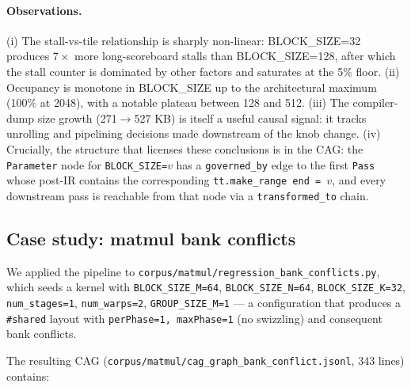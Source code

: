 \documentclass[10pt]{article}
\begin{document}
\paragraph{Observations.} (i) The stall-vs-tile relationship is sharply non-linear: BLOCK\_SIZE=32 produces $7\times$ more long-scoreboard stalls than BLOCK\_SIZE=128, after which the stall counter is dominated by other factors and saturates at the 5\% floor. (ii) Occupancy is monotone in BLOCK\_SIZE up to the architectural maximum (100\% at 2048), with a notable plateau between 128 and 512. (iii) The compiler-dump size growth (271$\to$527 KB) is itself a useful causal signal: it tracks unrolling and pipelining decisions made downstream of the knob change. (iv) Crucially, the structure that licenses these conclusions is in the CAG: the \texttt{Parameter} node for \texttt{BLOCK\_SIZE=$v$} has a \texttt{governed\_by} edge to the first \texttt{Pass} whose post-IR contains the corresponding \texttt{tt.make\_range end = $v$}, and every downstream pass is reachable from that node via a \texttt{transformed\_to} chain.

\subsection{Case study: matmul bank conflicts}\label{sec:matmul}

We applied the pipeline to \texttt{corpus/matmul/regression\_bank\_conflicts.py}, which seeds a kernel with \texttt{BLOCK\_SIZE\_M=64}, \texttt{BLOCK\_SIZE\_N=64}, \texttt{BLOCK\_SIZE\_K=32}, \texttt{num\_stages=1}, \texttt{num\_warps=2}, \texttt{GROUP\_SIZE\_M=1} --- a configuration that produces a \texttt{\#shared} layout with \texttt{perPhase=1, maxPhase=1} (no swizzling) and consequent bank conflicts.

The resulting CAG (\texttt{corpus/matmul/cag\_graph\_bank\_conflict.jsonl}, 343 lines) contains:
\end{document}
